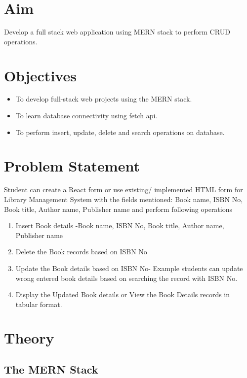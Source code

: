 \documentclass[11pt]{article}
\begin{document}
\tableofcontents
\thispagestyle{empty}
\clearpage

\setcounter{page}{1}

\section{Aim}
Develop a full stack web application using MERN stack to perform CRUD operations.

\section{Objectives}
\begin{itemize}
    \item To develop full-stack web projects using the MERN stack.
    \item To learn database connectivity using fetch api.
    \item To perform insert, update, delete and search operations on database.
\end{itemize}

\section{Problem Statement}
Student can create a React form or use existing/ implemented HTML form for Library
Management System with the fields mentioned: Book name, ISBN No, Book title, Author name,
Publisher name and perform following operations

\begin{enumerate}
    \item Insert Book details -Book name, ISBN No, Book title, Author name, Publisher name
    \item Delete the Book records based on ISBN No
    \item Update the Book details based on ISBN No- Example students can update wrong entered book details based on searching the record with ISBN No.
    \item Display the Updated Book details or View the Book Details records in tabular format.
\end{enumerate}

\section{Theory}
\subsection{The MERN Stack}
\end{document}

